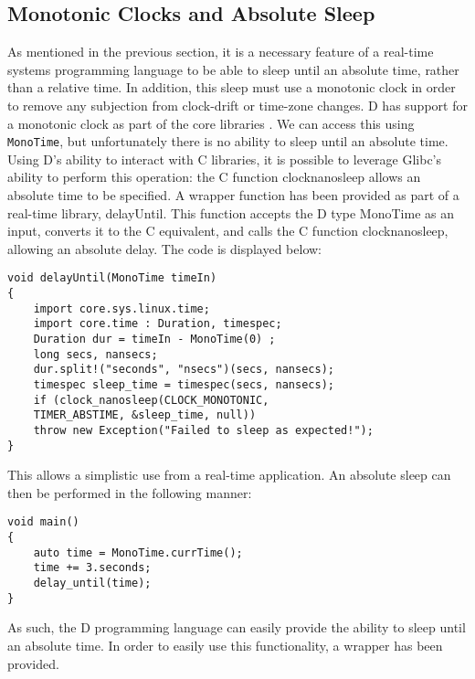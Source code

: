 \subsection{Monotonic Clocks and Absolute Sleep}
As mentioned in the previous section, it is a necessary feature of a real-time 
systems programming language to be able to sleep until an absolute time, rather 
than a relative time. In addition, this sleep must use a monotonic clock in order 
to remove any subjection from clock-drift or time-zone changes. D has support 
for a monotonic clock as part of the core libraries 
\cite{dlang-core-time}. We can access this using 
\texttt{MonoTime}, but unfortunately there is no ability to sleep until an 
absolute time. Using D's ability to interact with C libraries, it is possible 
to leverage Glibc's ability to perform this operation: the C function 
clock\textunderscore{}nanosleep allows an absolute time to be specified.
\cite{clock-nanosleep}
A wrapper function has been provided as part of a real-time library, delayUntil. 
This function accepts the D type MonoTime as an input, converts it to the C 
equivalent, and calls the C function clock\textunderscore{}nanosleep, allowing an absolute delay.
The code is displayed below: 
\begin{lstlisting}
void delayUntil(MonoTime timeIn)
{
    import core.sys.linux.time; 
    import core.time : Duration, timespec; 
    Duration dur = timeIn - MonoTime(0) ;
    long secs, nansecs; 
    dur.split!("seconds", "nsecs")(secs, nansecs); 
    timespec sleep_time = timespec(secs, nansecs); 
    if (clock_nanosleep(CLOCK_MONOTONIC, 
    TIMER_ABSTIME, &sleep_time, null))
    throw new Exception("Failed to sleep as expected!"); 
}
\end{lstlisting}
This allows a simplistic use from a real-time application. An absolute sleep can 
then be performed in the following manner: 
\begin{lstlisting}
void main()
{
    auto time = MonoTime.currTime(); 
    time += 3.seconds; 
    delay_until(time);
}
\end{lstlisting}
As such, the D programming language can easily provide the ability to sleep 
until an absolute time. In order to easily use this functionality, a 
wrapper has been provided.

